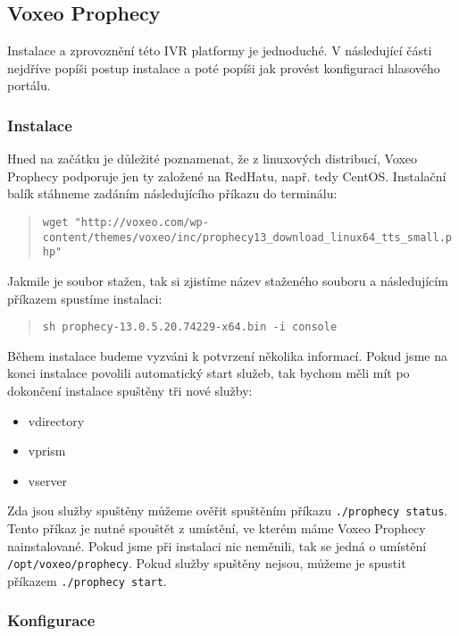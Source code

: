 \documentclass[ing,male,java,dept460]{diploma}						%
\begin{document}
\subsection{Voxeo Prophecy}
Instalace a zprovoznění této IVR platformy je jednoduché. V následující části nejdříve popíši postup instalace a poté popíši jak provést konfiguraci hlasového portálu.

\subsubsection{Instalace}
Hned na začátku je důležité poznamenat, že z linuxových distribucí, Voxeo Prophecy podporuje jen ty založené na RedHatu, např. tedy CentOS. Instalační balík stáhneme zadáním následujícího příkazu do terminálu:

\begin{quote}
\begin{sloppypar}
	\texttt{wget "http://voxeo.com/wp-content/themes/voxeo/inc/prophecy13\allowbreak\_download\_linux64\_tts\_small.php"}
\end{sloppypar}
\end{quote}

Jakmile je soubor stažen, tak si zjistíme název staženého souboru a následujícím příkazem spustíme instalaci:

\begin{quote}
	\texttt{sh prophecy-13.0.5.20.74229-x64.bin -i console}
\end{quote}

Během instalace budeme vyzváni k potvrzení několika informací. Pokud jsme na konci instalace povolili automatický start služeb, tak bychom měli mít po dokončení instalace spuštěny tři nové služby:

\begin{itemize}
\item vdirectory
\item vprism
\item vserver
\end{itemize}

Zda jsou služby spuštěny můžeme ověřit spuštěním příkazu \texttt{./prophecy status}. Tento příkaz je nutné spouštět z umístění, ve kterém máme Voxeo Prophecy nainstalované. Pokud jsme při instalaci nic neměnili, tak se jedná o umístění \texttt{/opt/voxeo/prophecy}. Pokud služby spuštěny nejsou, můžeme je spustit příkazem \texttt{./prophecy start}.

\subsubsection{Konfigurace}
\end{document}
